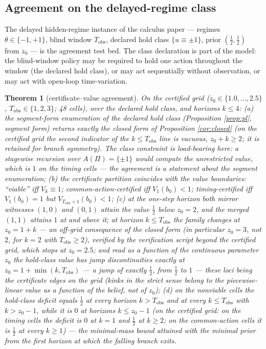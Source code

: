 \documentclass[10pt,twocolumn]{article}
\theoremstyle{plain}
\newtheorem{theorem}{Theorem}
\theoremstyle{definition}
\theoremstyle{remark}
\begin{document}
\subsection{Agreement on the delayed-regime class}\label{agreement}

The delayed hidden-regime instance of the calculus paper --- regimes
\(\theta \in \{-1, +1\}\), blind window \(T_{\mathrm{obs}}\), declared
hold class \(\{u \equiv \pm 1\}\), prior \((\tfrac12, \tfrac12)\) from
\(z_{0}\) --- is the agreement test bed. The class declaration is part of
the model: the blind-window policy may be required to hold one action
throughout the window (the declared hold class), or may act sequentially
without observation, or may act with open-loop time-variation.

\begin{theorem}[certificate--value agreement]\label{thm:agree}
On the certified grid (\(z_{0} \in \{1.0, \dots, 2.5\}\),
\(T_{\mathrm{obs}} \in \{1,2,3\}\); 48 cells), over the declared hold
class, and horizons \(k \le 4\):
(a) the segment-form enumeration of the declared hold class
(Proposition \ref{prop:pl}, segment form) returns exactly the closed
form of Proposition
\ref{cor:closed} (on the certified grid the second indicator of the
\(k \le T_{\mathrm{obs}}\) line is vacuous, \(z_{0} + k \ge 2\); it is
retained for branch symmetry). The class constraint is load-bearing
here: a stagewise recursion over \(A(\Pi) = \{\pm 1\}\) would compute
the unrestricted value, which is \(1\) on the timing cells --- the
agreement is a statement about the segment enumeration;
(b) the certificate partition coincides with the value boundaries:
``viable'' iff \(V_{k} \equiv 1\); common-action-certified iff
\(V_{1}(b_{0}) < 1\); timing-certified iff \(V_{1}(b_{0}) = 1\) but
\(V_{T_{\mathrm{obs}}+1}(b_{0}) < 1\);
(c) at the one-step horizon both mirror witnesses \((1,0)\) and
\((0,1)\) attain the value \(\tfrac{1}{2}\) below \(z_{0} = 2\), and
the merged \((1,1)\) attains \(1\) at and above it; at horizon
\(k \le T_{\mathrm{obs}}\) the family changes at \(z_{0} = 1 + k\) ---
an off-grid consequence of the closed form (in particular \(z_{0} = 3\),
not \(2\), for \(k = 2\) with \(T_{\mathrm{obs}} \ge 2\)), verified
by the verification script beyond the certified grid, which stops at
\(z_{0} = 2.5\); and read as a function of
the continuous parameter \(z_{0}\) the hold-class value has jump
discontinuities exactly at \(z_{0} = 1 + \min(k, T_{\mathrm{obs}})\) --- a
jump of exactly \(\tfrac{1}{2}\), from \(\tfrac{1}{2}\) to \(1\) --- these
loci being the certificate edges on the grid (kinks in the strict sense
belong to the piecewise-linear value as a function of the belief, not of
\(z_{0}\));
(d) on the nonviable cells the hold-class deficit equals
\(\tfrac{1}{2}\) at every horizon \(k > T_{\mathrm{obs}}\) and at
every \(k \le T_{\mathrm{obs}}\) with \(k > z_{0} - 1\), while it is
\(0\) at horizons \(k \le z_{0} - 1\) (on the certified grid: on the
timing cells the deficit is \(0\) at \(k = 1\) and \(\tfrac{1}{2}\)
at \(k \ge 2\); on the common-action cells it is \(\tfrac{1}{2}\) at
every \(k \ge 1\)) --- the minimal-mass bound attained with the
minimal prior from the first horizon at which the falling branch
exits.
\end{theorem}
\end{document}
